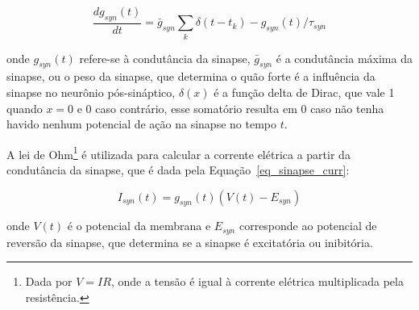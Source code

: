 \begin{equation}
\label{eq_sinapse}
\frac{dg_{syn}(t)}{dt} = \bar{g}_{syn}\sum_{k}{\delta(t-t_k)} - g_{syn}(t)/\tau_{syn}
\end{equation}

\noindent{}onde $g_{syn}(t)$ refere-se à condutância da sinapse, $\bar{g}_{syn}$ é a condutância máxima da sinapse, ou o peso da
sinapse, que determina o quão forte é a influência da sinapse no neurônio pós-sináptico, $\delta(x)$ é a função delta de Dirac, que
vale 1 quando $x=0$ e 0 caso contrário, esse somatório resulta em 0 caso não tenha havido nenhum potencial de ação na sinapse no
tempo $t$.

A lei de Ohm\footnote{Dada por $V=IR$, onde a tensão é igual à corrente elétrica multiplicada pela resistência.} é utilizada para
calcular a corrente elétrica a partir da condutância da sinapse, que é dada pela Equação~\ref{eq_sinapse_curr}:

\begin{equation}
\label{eq_sinapse_curr}
I_{syn}(t)=g_{syn}(t)(V(t)-E_{syn})
\end{equation}

\noindent{}onde $V(t)$ é o potencial da membrana e $E_{syn}$ corresponde ao potencial de reversão da sinapse, que determina se a sinapse é
excitatória ou inibitória.

